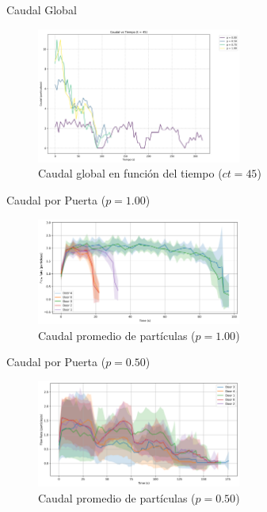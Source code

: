\documentclass[aspectratio=169]{beamer}
\begin{document}
\begin{frame}{Caudal Global}
    \begin{figure}
        \centering
        \includegraphics[width=0.6\textwidth]{img/caudal_vs_time_t45.png}
        \caption{Caudal global en función del tiempo ($ct=45$)}
    \end{figure}
\end{frame}

\begin{frame}{Caudal por Puerta ($p=1.00$)}
    \begin{figure}
        \centering
        \includegraphics[width=0.6\textwidth]{img/door_flow_rates_t_20_&_p_1.00.png}
        \caption{Caudal promedio de partículas ($p=1.00$)}
    \end{figure}
\end{frame}

\begin{frame}{Caudal por Puerta ($p=0.50$)}
    \begin{figure}
        \centering
        \includegraphics[width=0.6\textwidth]{img/door_flow_rates_t_20_&_p_0.50.png}
        \caption{Caudal promedio de partículas ($p=0.50$)}
    \end{figure}
\end{frame}
\end{document}
